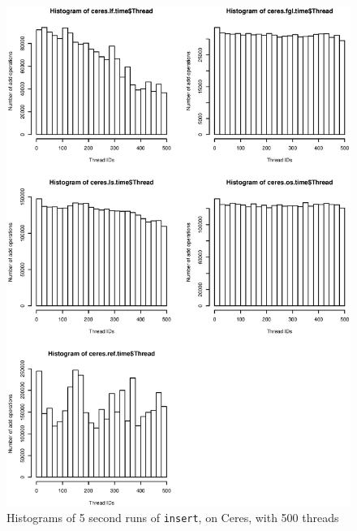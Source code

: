\begin{figure}[H]
  \centering
  \includegraphics[height=0.95\textheight]{pictures/ceres_fairness_plot.eps}
  \caption{Histograms of 5 second runs of \texttt{insert}, on Ceres, with 500 threads}
  \label{ceresfairness}
\end{figure}

\nocite{*} %

\clearpage %
{}
